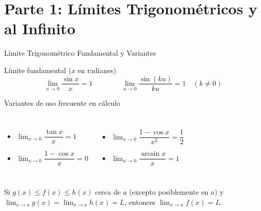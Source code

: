 \documentclass[aspectratio=169]{beamer}
\begin{document}
\begin{frame}[plain]
  \titlepage
\end{frame}

\section{Parte 1: Límites Trigonométricos y al Infinito}


\begin{frame}{Límite Trigonométrico Fundamental y Variantes}
  \begin{block}{Límite fundamental ($x$ en radianes)}
    $$\boxed{\lim_{x \to 0} \frac{\sin x}{x} = 1} \qquad\qquad \boxed{\lim_{u \to 0} \frac{\sin(ku)}{ku} = 1 \quad (k \neq 0)}$$
  \end{block}

  \vspace{4pt}
  \begin{block}{Variantes de uso frecuente en cálculo}
    \begin{columns}[T]
      \begin{itemize}
        \item $\lim_{x \to 0} \dfrac{\tan x}{x} = 1$
        \item $\lim_{x \to 0} \dfrac{1 - \cos x}{x} = 0$
      \end{itemize}
      \begin{itemize}
        \item $\lim_{x \to 0} \dfrac{1 - \cos x}{x^2} = \dfrac{1}{2}$
        \item $\lim_{x \to 0} \dfrac{\arcsin x}{x} = 1$
      \end{itemize}
    \end{columns}
  \end{block}

  \vspace{4pt}
  \begin{mwextra}
    Si $g(x) \le f(x) \le h(x)$ cerca de $a$ (excepto posiblemente en $a$) y $\lim_{x \to a} g(x) = \lim_{x \to a} h(x) = L$, entonces $\lim_{x \to a} f(x) = L$.
  \end{mwextra}
\end{frame}
\end{document}
